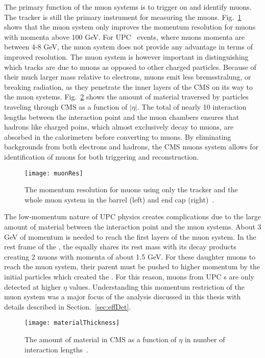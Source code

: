     The primary function of the muon systems is to trigger on and identify 
      muons.
    The tracker is still the primary instrument for measuring the muons. 
    Fig.~\ref{fig:muonRes} shows that the muon system only improves the 
      momentum resolution for muons with momenta above 100 GeV. 
    For UPC \JPsi{}~events, where muons momenta are between 4-8 GeV, the muon
      system does not provide any advantage in terms of improved resolution.
    The muon system is however important in distinguishing which tracks are 
      due to muons as opposed to other charged particles.
    Because of their much larger mass relative to electrons, muons emit less 
      bremsstralung, or breaking radiation, as they penetrate the inner layers
      of the CMS on its way to the muon systems.
    Fig.~\ref{fig:matThick} shows the amount of material traversed by particles
      traveling through CMS as a function of $|\eta|$.
    The total of nearly 10 interaction lengths between the interaction point 
      and the muon chambers ensures that hadrons like charged poins, which
      almost exclusively decay to muons, are absorbed in the calorimeters 
      before converting to muons. 
    By eliminating backgrounds from both electrons and hadrons, the CMS muons 
      system allows for identification of muons for both triggering and 
      reconstruction.
    \begin{figure}[!Hhbt]
      \centering
      \texttt{[image: muonRes]}
      \caption{ The momentum resolution for muons using only the 
        tracker and the whole muon system in the barrel (left) and end cap 
        (right)~\cite{tCmsE}.}
      \label{fig:muonRes}
    \end{figure}

    The low-momentum nature of UPC physics creates complications due to the 
      large amount of material between the interaction point and the muon 
      systems.
    About 3 GeV of momentum is needed to reach the first layers of the muon 
      system.
    In the rest frame of the \JPsi{}, the \JPsi{} equally shares its rest mass with 
      its decay products creating 2 muons with momenta of about 1.5 GeV.
    For these daughter muons to reach the muon system, their parent \JPsi{} must
      be pushed to higher momentum by the initial particles which created the
      \JPsi{}.
    For this reason, muons from UPC \JPsi{}s are only detected at higher 
      $\eta$ values.
    Understanding this momentum restriction of the muon system was a major 
      focus of the analysis discussed in this thesis with details described in 
      Section.~\ref{sec:effDet}.
    \begin{figure}[!Hhbt]
      \centering
      \texttt{[image: materialThickness]}
      \caption{The amount of material in CMS as a function of $\eta$ in 
        number of interaction lengths~\cite{tCmsE}.}
      \label{fig:matThick}
    \end{figure}
 
